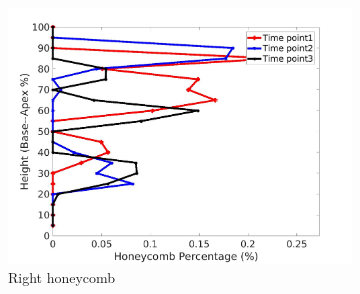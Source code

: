 \begin{figure}[H]
\begin{subfigure}{.42\linewidth}
  \includegraphics[width=\linewidth,trim={{.0\wd0} {.0\wd0} {.0\wd0} {.0\wd0}},clip]{Appendix/Image_AppexA/BaseToApex/IPF2RightLungHoneycombDiseaseAgainstHeight.jpg}
  \caption{Right honeycomb}
  \label{fig:IPF2DiseaseAgainstHeight-f}
\end{subfigure}
\begin{subfigure}{.42\linewidth}%

\end{subfigure}
\end{figure}
